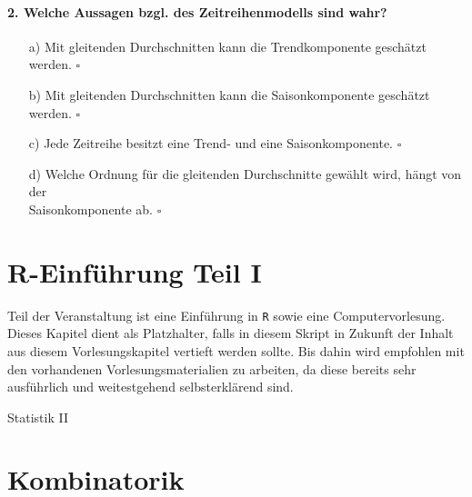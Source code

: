 \documentclass[a4paper]{article}
\begin{document}
\paragraph{2. Welche Aussagen bzgl. des Zeitreihenmodells sind wahr?}

\begin{itemize}
    \item[a)] Mit gleitenden Durchschnitten kann die Trendkomponente geschätzt werden. \hfill $\square$
    \item[b)] Mit gleitenden Durchschnitten kann die Saisonkomponente geschätzt werden. \hfill $\square$
    \item[c)] Jede Zeitreihe besitzt eine Trend- und eine Saisonkomponente. \hfill $\square$
    \item[d)] Welche Ordnung für die gleitenden Durchschnitte gewählt wird, hängt von der\\Saisonkomponente ab. \hfill $\square$
\end{itemize}


\clearpage


\section{R-Einführung Teil I}

Teil der Veranstaltung ist eine Einführung in \texttt{R} sowie eine Computervorlesung. Dieses Kapitel dient als Platzhalter, falls in diesem Skript in Zukunft der Inhalt aus diesem Vorlesungskapitel vertieft werden sollte. Bis dahin wird empfohlen mit den vorhandenen Vorlesungsmaterialien zu arbeiten, da diese bereits sehr ausführlich und weitestgehend selbsterklärend sind.

\clearpage

\hspace{0pt}
\vfill
\begin{center}
    {\Huge Statistik II}
\end{center}
\vfill
\hspace{0pt}


\clearpage


\section{Kombinatorik}
\end{document}
